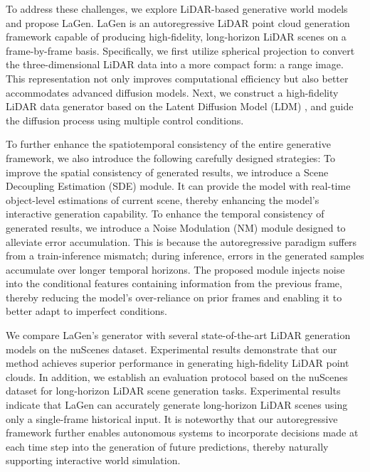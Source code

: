 To address these challenges, we explore LiDAR-based generative world models and propose LaGen. 
LaGen is an autoregressive LiDAR point cloud generation framework capable of producing high-fidelity, long-horizon LiDAR scenes on a frame-by-frame basis.
Specifically, we first utilize spherical projection to convert the three-dimensional LiDAR data into a more compact form: a range image.
This representation not only improves computational efficiency but also better accommodates advanced diffusion models.
Next, we construct a high-fidelity LiDAR data generator based on the Latent Diffusion Model (LDM) \cite{rombach2022high}, and guide the diffusion process using multiple control conditions.

To further enhance the spatiotemporal consistency of the entire generative framework, we also introduce the following carefully designed strategies:
To improve the spatial consistency of generated results, we introduce a Scene Decoupling Estimation (SDE) module. 
It can provide the model with real-time object-level estimations of current scene, thereby enhancing the model's interactive generation capability.
To enhance the temporal consistency of generated results, we introduce a Noise Modulation (NM) module designed to alleviate error accumulation. 
This is because the autoregressive paradigm suffers from a train-inference mismatch; during inference, errors in the generated samples accumulate over longer temporal horizons.
The proposed module injects noise into the conditional features containing information from the previous frame, thereby reducing the model's over-reliance on prior frames and enabling it to better adapt to imperfect conditions.

We compare LaGen’s generator with several state-of-the-art LiDAR generation models on the nuScenes dataset. 
Experimental results demonstrate that our method achieves superior performance in generating high-fidelity LiDAR point clouds.
In addition, we establish an evaluation protocol based on the nuScenes dataset for long-horizon LiDAR scene generation tasks.
Experimental results indicate that LaGen can accurately generate long-horizon LiDAR scenes using only a single-frame historical input.
It is noteworthy that our autoregressive framework further enables autonomous systems to incorporate decisions made at each time step into the generation of future predictions, thereby naturally supporting interactive world simulation.

